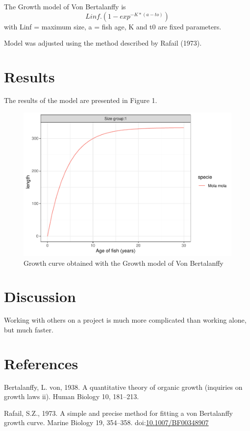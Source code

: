 \documentclass[]{elsarticle} %
\begin{document}
The Growth model of Von Bertalanffy is \[Linf.(1-exp^{-K*(a-to)})\] with
Linf = maximum size, a = fish age, K and t0 are fixed parameters.

Model was adjusted using the method described by Rafail (1973).

\hypertarget{results}{%
\section{Results}\label{results}}

The results of the model are presented in Figure 1.

\begin{figure}
\centering
\includegraphics{ElsevierRBertalanffyPackage_files/figure-latex/unnamed-chunk-1-1.pdf}
\caption{Growth curve obtained with the Growth model of Von Bertalanffy}
\end{figure}

\hypertarget{discussion}{%
\section{Discussion}\label{discussion}}

Working with others on a project is much more complicated than working
alone, but much faster.

\hypertarget{references}{%
\section*{References}\label{references}}

\hypertarget{refs}{}
\leavevmode\hypertarget{ref-Bertalanffy1938}{}%
Bertalanffy, L. von, 1938. A quantitative theory of organic growth
(inquiries on growth laws ii). Human Biology 10, 181--213.

\leavevmode\hypertarget{ref-rafail_simple_1973}{}%
Rafail, S.Z., 1973. A simple and precise method for fitting a von
Bertalanffy growth curve. Marine Biology 19, 354--358.
doi:\href{https://doi.org/10.1007/BF00348907}{10.1007/BF00348907}
\end{document}
